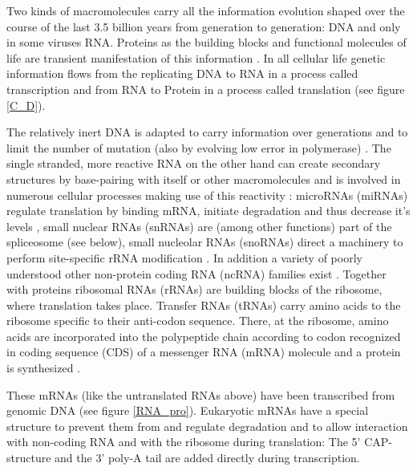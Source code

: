 Two kinds of macromolecules carry all the information evolution shaped
over the course of the last 3.5 billion years from generation to
generation: DNA and only in some viruses RNA. Proteins as the building
blocks and functional molecules of life are transient manifestation of
this information \cite{crick1958biological}. In all cellular life
genetic information flows from the replicating DNA to RNA in a process
called transcription and from RNA to Protein in a process called
translation \cite{pmid5422595} (see figure \ref{C_D}).

The relatively inert DNA is adapted to carry information over
generations and to limit the number of mutation (also by evolving low
error in polymerase) \cite{pmid21821597}. The single stranded, more
reactive RNA on the other hand can create secondary structures by
base-pairing with itself or other macromolecules and is involved in
numerous cellular processes making use of this reactivity
\cite{pmid21850044}: microRNAs (miRNAs) regulate translation by
binding mRNA, initiate degradation and thus decrease it's levels
\cite{pmid20703300,pmid11679654}, small nuclear RNAs (snRNAs) are
(among other functions) part of the spliceosome (see below), small
nucleolar RNAs (snoRNAs) direct a machinery to perform site-specific
rRNA modification \cite{pmid19446021}. In addition a variety of poorly
understood other non-protein coding RNA (ncRNA) families exist
\cite{pmid16344563}. Together with proteins ribosomal RNAs (rRNAs) are
building blocks of the ribosome, where translation takes
place. Transfer RNAs (tRNAs) carry amino acids to the ribosome
specific to their anti-codon sequence. There, at the ribosome, amino
acids are incorporated into the polypeptide chain according to codon
recognized in coding sequence (CDS) of a messenger RNA (mRNA) molecule
and a protein is synthesized \cite{pmid4887876}.

These mRNAs (like the untranslated RNAs above) have been transcribed
from genomic DNA (see figure \ref{RNA_pro}). Eukaryotic mRNAs have a
special structure to prevent them from and regulate degradation and to
allow interaction with non-coding RNA and with the ribosome during
translation: The 5' CAP-structure and the 3' poly-A tail are added
directly during transcription.


